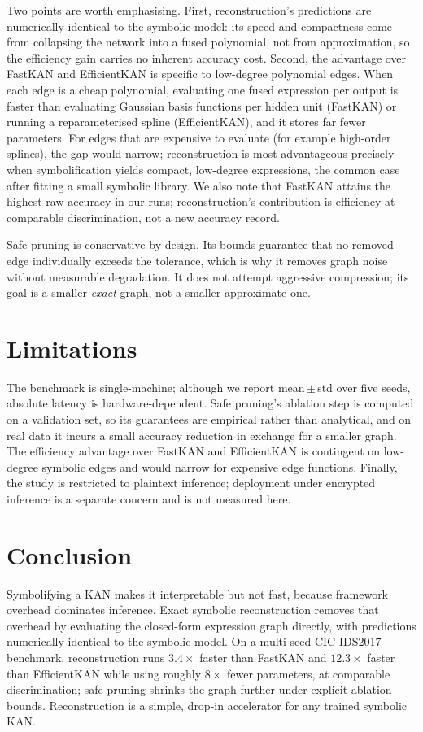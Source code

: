 \documentclass[conference]{IEEEtran}
\begin{document}
Two points are worth emphasising. First, reconstruction's predictions are
numerically identical to the symbolic model: its speed and compactness come
from collapsing the network into a fused polynomial, not from approximation, so
the efficiency gain carries no inherent accuracy cost. Second, the advantage
over FastKAN and EfficientKAN is specific to low-degree polynomial edges. When
each edge is a cheap polynomial, evaluating one fused expression per output is
faster than evaluating Gaussian basis functions per hidden unit (FastKAN) or
running a reparameterised spline (EfficientKAN), and it stores far fewer
parameters. For edges that are expensive to evaluate (for example high-order
splines), the gap would narrow; reconstruction is most advantageous precisely
when symbolification yields compact, low-degree expressions, the common case
after fitting a small symbolic library. We also note that FastKAN attains the
highest raw accuracy in our runs; reconstruction's contribution is efficiency
at comparable discrimination, not a new accuracy record.

Safe pruning is conservative by design. Its bounds guarantee that no removed
edge individually exceeds the tolerance, which is why it removes graph noise
without measurable degradation. It does not attempt aggressive compression; its
goal is a smaller \emph{exact} graph, not a smaller approximate one.

\section{Limitations}

The benchmark is single-machine; although we report mean\,$\pm$\,std over five
seeds, absolute latency is hardware-dependent. Safe pruning's ablation step is
computed on a validation set, so its guarantees are empirical rather than
analytical, and on real data it incurs a small accuracy reduction in exchange
for a smaller graph. The efficiency advantage over FastKAN and EfficientKAN is
contingent on low-degree symbolic edges and would narrow for expensive edge
functions. Finally, the study is restricted to plaintext inference; deployment
under encrypted inference is a separate concern and is not measured here.

\section{Conclusion}

Symbolifying a KAN makes it interpretable but not fast, because framework
overhead dominates inference. Exact symbolic reconstruction removes that
overhead by evaluating the closed-form expression graph directly, with
predictions numerically identical to the symbolic model. On a multi-seed
CIC-IDS2017 benchmark, reconstruction runs $3.4\times$ faster than FastKAN and
$12.3\times$ faster than EfficientKAN while using roughly $8\times$ fewer
parameters, at comparable discrimination; safe pruning shrinks the graph
further under explicit ablation bounds. Reconstruction is a simple, drop-in
accelerator for any trained symbolic KAN.
\end{document}

